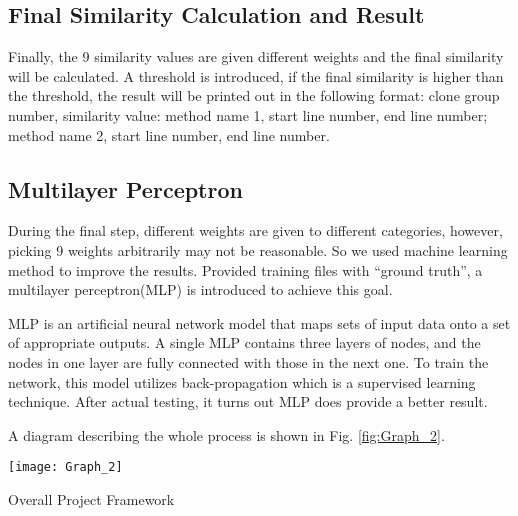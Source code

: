 \documentclass[../main.tex]{subfiles}
\begin{document}
\subsection{Final Similarity Calculation and Result}

Finally, the 9 similarity values are given different weights and the final similarity will be calculated. A threshold is introduced, if the final similarity is higher than the threshold, the result will be printed out in the following format: clone group number, similarity value: method name 1, start line number, end line number; method name 2, start line number, end line number.


\subsection{Multilayer Perceptron}

During the final step, different weights are given to different categories, however, picking 9 weights arbitrarily may not be reasonable. So we used machine learning method to improve the results. Provided training files with ``ground truth'', a multilayer perceptron(MLP) is introduced to achieve this goal. 

MLP\cite{mlp} is an artificial neural network model that maps sets of input data onto a set of appropriate outputs. A single MLP contains three layers of nodes, and the nodes in one layer are fully connected with those in the next one. To train the network, this model utilizes back-propagation which is a supervised learning technique.
After actual testing, it turns out MLP does provide a better result.

A diagram describing the whole process is shown in Fig. \ref{fig:Graph_2}.\\

\begin{figurehere}
\centering \texttt{[image: Graph\_2]} 
\caption{Overall Project Framework} \label{fig:Graph_2}
\end{figurehere}
\end{document}
